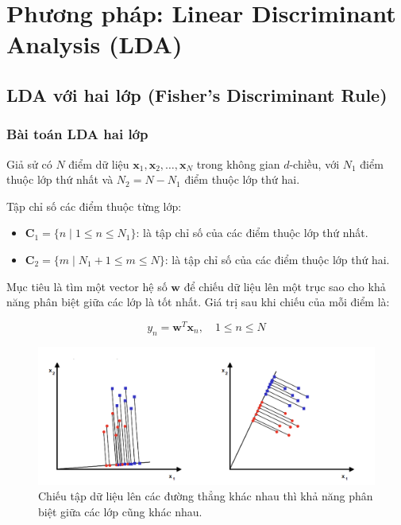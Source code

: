 \documentclass[
  a4paper,
]{article}
\providecommand{\tightlist}{%
  \setlength{\itemsep}{0pt}\setlength{\parskip}{0pt}}
\begin{document}
\section{Phương pháp: Linear Discriminant Analysis
(LDA)}\label{phux1b0ux1a1ng-phuxe1p-linear-discriminant-analysis-lda}

\subsection{LDA với hai lớp (Fisher's Discriminant
Rule)}\label{lda-vux1edbi-hai-lux1edbp-fishers-discriminant-rule}

\subsubsection{Bài toán LDA hai
lớp}\label{buxe0i-touxe1n-lda-hai-lux1edbp}

Giả sử có \(N\) điểm dữ liệu
\(\mathbf{x}_1, \mathbf{x}_2, …, \mathbf{x}_N\) trong không gian
\(d\)-chiều, với \(N_1\) điểm thuộc lớp thứ nhất và \(N_2 = N - N_1\)
điểm thuộc lớp thứ hai.

Tập chỉ số các điểm thuộc từng lớp:

\begin{itemize}
\tightlist
\item
  \(\mathbf{C}_1 = \{ n \; | \; 1 \leq n \leq N_1 \}\): là tập chỉ số
  của các điểm thuộc lớp thứ nhất.
\item
  \(\mathbf{C}_2 = \{ m \; | \; N_1 + 1 \leq m \leq N \}\): là tập chỉ
  số của các điểm thuộc lớp thứ hai.
\end{itemize}

Mục tiêu là tìm một vector hệ số \(\mathbf{w}\) để chiếu dữ liệu lên một
trục sao cho khả năng phân biệt giữa các lớp là tốt nhất. Giá trị sau
khi chiếu của mỗi điểm là:

\[y_n = \mathbf{w}^T \mathbf{x}_n, \quad 1 \leq n \leq N\]

\begin{figure}
\centering
\includegraphics{./assets/projection.png}
\caption{Chiếu tập dữ liệu lên các đường thẳng khác nhau thì khả năng
phân biệt giữa các lớp cũng khác nhau.}
\end{figure}
\end{document}

